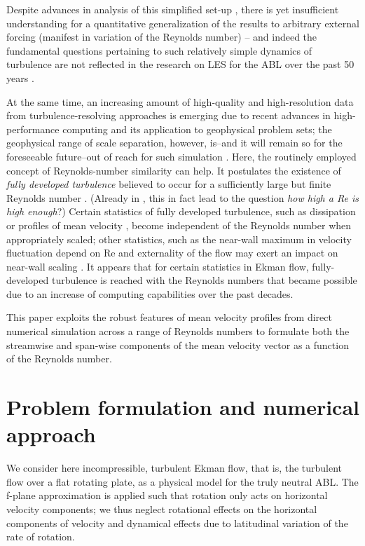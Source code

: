\documentclass[smallcondensed,final]{svjour3}
\newcommand{\RE}{\mathrm{Re}}
\begin{document}
%
Despite advances in analysis of this simplified set-up \citep{jiang:JAS2018}, 
there is yet insufficient understanding for a quantitative generalization of the results to
arbitrary external forcing (manifest in variation of the Reynolds number) -- and indeed the fundamental
questions pertaining to such relatively simple dynamics of turbulence are not reflected in the
research on LES for the ABL over the past 50 years \citep{stoll:BM2020}. 
%
\par
% 
At the same time, an increasing amount of high-quality and high-resolution data from turbulence-resolving approaches
is emerging due to recent advances in high-performance computing and its application to geophysical problem sets;
the geophysical range of scale separation, however, is--and it will remain so for the foreseeable future--out of reach
for such simulation \citep{dimotakis:ARF2005}.
%
Here, the routinely employed concept of Reynolds-number similarity can help. It postulates the existence
of \emph{fully developed turbulence}  believed to occur for a sufficiently large but finite Reynolds number
\citep{barenblatt:PF1995}.
%
(Already in \citeyear{moin:ARF1998}, this in fact lead \citeauthor{moin:ARF1998} to the question \emph{how high a Re is high enough}?) 
%
Certain statistics of fully developed turbulence, such as dissipation \citep{dimotakis:ARF2005} or profiles of
mean velocity \citep{barenblatt:JFM1993}, become independent of the Reynolds number when appropriately scaled; 
other statistics, such as the near-wall maximum in velocity fluctuation depend on $\RE$ \citep{baars:JFM2020a} and externality
of the flow may exert an impact on near-wall scaling \citep{dasilva:ARF2014}. 
%
It appears that for certain statistics in Ekman flow, fully-developed turbulence is reached with the
Reynolds numbers that became possible due to an increase of computing capabilities over
the past decades.
%
\par
% 
This paper exploits the robust features of mean velocity profiles from direct numerical
simulation across a range of Reynolds numbers to formulate both the streamwise and span-wise components
of the mean velocity vector as a function of the Reynolds number.
%
\section{Problem formulation and numerical approach}
%
We consider here incompressible, turbulent Ekman flow, that is, the turbulent flow over a flat rotating plate, as a physical model for the truly neutral ABL.
%
The f-plane approximation is applied such that rotation only acts on horizontal velocity components;
we thus neglect rotational effects on the horizontal components of velocity and dynamical effects
due to latitudinal variation of the rate of rotation.
%
\end{document}
